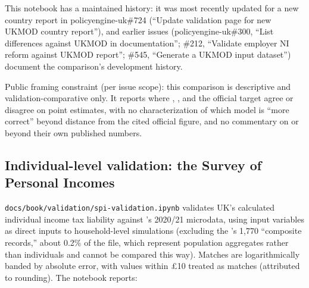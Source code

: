 This notebook has a maintained history: it was most recently updated for a
new \ukmod{} country report in policyengine-uk\#724 (``Update validation
page for new UKMOD country report''), and earlier issues
(policyengine-uk\#300, ``List differences against UKMOD in documentation'';
\#212, ``Validate employer NI reform against UKMOD report''; \#545,
``Generate a UKMOD input dataset'') document the comparison's development
history. 

Public framing constraint (per issue scope): this comparison is descriptive
and validation-comparative only. It reports where \policyengine{}, \ukmod{},
and the official target agree or disagree on point estimates, with no
characterization of which model is ``more correct'' beyond distance from
the cited official figure, and no commentary on \ukmod{} or \euromod{}
beyond their own published numbers.

\subsection{Individual-level validation: the Survey of Personal Incomes}
\label{sec:validation-spi}

\texttt{docs/book/validation/spi-validation.ipynb} validates
\policyengine{} UK's calculated individual income tax liability against
\hmrc{}'s \spi{} 2020/21 microdata, using \spi{} input variables as direct
inputs to household-level \policyengine{} simulations (excluding the
\spi{}'s 1,770 ``composite records,'' about 0.2\% of the file, which
represent population aggregates rather than individuals and cannot be
compared this way). Matches are logarithmically banded by absolute error,
with values within \pounds{}10 treated as matches (attributed to rounding).
The notebook reports:

